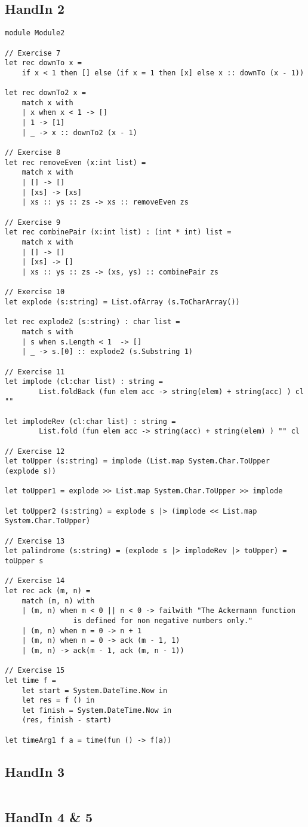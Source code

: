 \subsection{HandIn 2}
\label{Appendix_FSharp_Melnyk_2}
\begin{lstlisting}
module Module2

// Exercise 7
let rec downTo x = 
	if x < 1 then [] else (if x = 1 then [x] else x :: downTo (x - 1))

let rec downTo2 x = 
    match x with
    | x when x < 1 -> []
    | 1 -> [1]
    | _ -> x :: downTo2 (x - 1)

// Exercise 8
let rec removeEven (x:int list) = 
    match x with 
    | [] -> []
    | [xs] -> [xs]
    | xs :: ys :: zs -> xs :: removeEven zs

// Exercise 9
let rec combinePair (x:int list) : (int * int) list = 
    match x with
    | [] -> []
    | [xs] -> []
    | xs :: ys :: zs -> (xs, ys) :: combinePair zs

// Exercise 10
let explode (s:string) = List.ofArray (s.ToCharArray())

let rec explode2 (s:string) : char list = 
    match s with
    | s when s.Length < 1  -> []
    | _ -> s.[0] :: explode2 (s.Substring 1)

// Exercise 11
let implode (cl:char list) : string = 
		List.foldBack (fun elem acc -> string(elem) + string(acc) ) cl ""

let implodeRev (cl:char list) : string = 
		List.fold (fun elem acc -> string(acc) + string(elem) ) "" cl 

// Exercise 12
let toUpper (s:string) = implode (List.map System.Char.ToUpper (explode s))

let toUpper1 = explode >> List.map System.Char.ToUpper >> implode

let toUpper2 (s:string) = explode s |> (implode << List.map System.Char.ToUpper)

// Exercise 13
let palindrome (s:string) = (explode s |> implodeRev |> toUpper) = toUpper s

// Exercise 14
let rec ack (m, n) = 
    match (m, n) with
    | (m, n) when m < 0 || n < 0 -> failwith "The Ackermann function 
				is defined for non negative numbers only."
    | (m, n) when m = 0 -> n + 1
    | (m, n) when n = 0 -> ack (m - 1, 1)
    | (m, n) -> ack(m - 1, ack (m, n - 1))

// Exercise 15
let time f = 
    let start = System.DateTime.Now in
    let res = f () in
    let finish = System.DateTime.Now in
    (res, finish - start)

let timeArg1 f a = time(fun () -> f(a))
\end{lstlisting}
\subsection{HandIn 3}
\label{Appendix_FSharp_Melnyk_3}
\begin{lstlisting}
\end{lstlisting}
\subsection{HandIn 4 \& 5}
\label{Appendix_FSharp_Melnyk_4and5}
\begin{lstlisting}
\end{lstlisting}